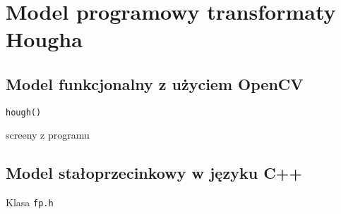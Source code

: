 \section{Model programowy transformaty Hougha}



\subsection{Model funkcjonalny z użyciem OpenCV}

\texttt{hough()}

screeny z programu

%
%
%
%

%

\newpage
\subsection{Model stałoprzecinkowy w języku C++}

Klasa \texttt{fp.h}

